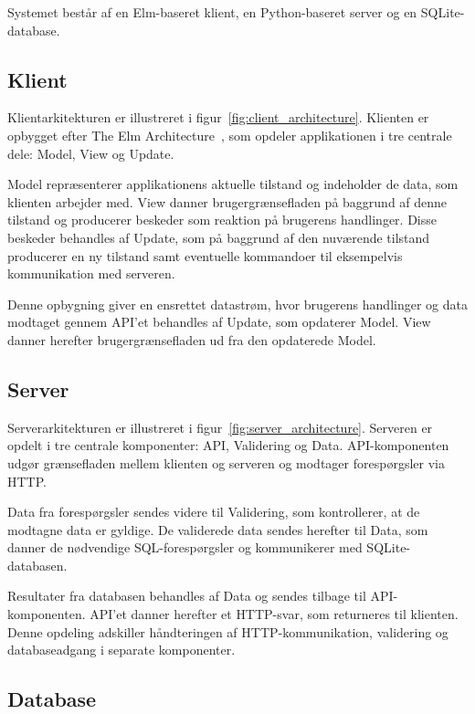 \documentclass[a4paper, 11pt]{article}
\begin{document}
Systemet består af en Elm-baseret klient, en Python-baseret server og en SQLite-database.

\subsection{Klient}

Klientarkitekturen er illustreret i figur~\ref{fig:client_architecture}. Klienten er opbygget
efter The Elm Architecture~\cite{elm_architecture}, som opdeler applikationen i tre centrale
dele: Model, View og Update.

Model repræsenterer applikationens aktuelle tilstand og indeholder de data, som klienten
arbejder med. View danner brugergrænsefladen på baggrund af denne tilstand og producerer
beskeder som reaktion på brugerens handlinger. Disse beskeder behandles af Update, som på
baggrund af den nuværende tilstand producerer en ny tilstand samt eventuelle kommandoer til
eksempelvis kommunikation med serveren.

Denne opbygning giver en ensrettet datastrøm, hvor brugerens handlinger og data modtaget
gennem API'et behandles af Update, som opdaterer Model. View danner herefter
brugergrænsefladen ud fra den opdaterede Model.

\subsection{Server}

Serverarkitekturen er illustreret i figur~\ref{fig:server_architecture}. Serveren er opdelt i
tre centrale komponenter: API, Validering og Data. API-komponenten udgør grænsefladen
mellem klienten og serveren og modtager forespørgsler via HTTP.

Data fra forespørgsler sendes videre til Validering, som kontrollerer, at de modtagne data er
gyldige. De validerede data sendes herefter til Data, som danner de nødvendige
SQL-forespørgsler og kommunikerer med SQLite-databasen.

Resultater fra databasen behandles af Data og sendes tilbage til API-komponenten. API'et
danner herefter et HTTP-svar, som returneres til klienten. Denne opdeling adskiller
håndteringen af HTTP-kommunikation, validering og databaseadgang i separate komponenter.

\subsection{Database}
\end{document}
